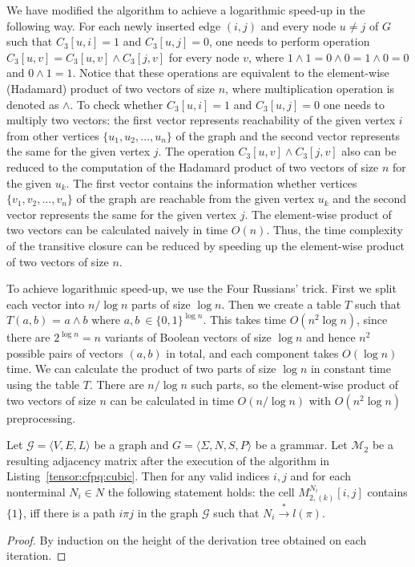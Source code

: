 We have modified the algorithm to achieve a logarithmic speed-up in the following way.
For each newly inserted edge $(i, j)$ and every node $u \neq j$ of $G$ such that $C_3[u, i] = 1$ and $C_3[u, j]=0$, one needs to perform operation $C_3[u,v] = C_3[u, v] \wedge C_3[j, v]$ for every node $v$, where $1 \wedge 1 = 0 \wedge 0 = 1 \wedge 0 = 0$ and $0 \wedge 1 = 1$.
Notice that these operations are equivalent to the element-wise (Hadamard) product of two vectors of size $n$, where multiplication operation is denoted as $\wedge$. To check whether $C_3[u, i] = 1$ and $C_3[u, j]=0$ one needs to multiply two vectors: the first vector represents reachability of the given vertex $i$ from other vertices $\{u_1, u_2, ..., u_n\}$ of the graph and the second vector represents the same for the given vertex $j$. The operation $C_3[u, v] \wedge C_3[j, v]$ also can be reduced to the computation of the Hadamard product of two vectors of size $n$ for the given $u_k$. The first vector contains the information whether vertices  $\{v_1, v_2, ..., v_n\}$ of the graph are reachable from the given vertex $u_k$ and the second vector represents the same for the given vertex $j$. The element-wise product of two vectors can be calculated naively in time $O(n)$. Thus, the time complexity of the transitive closure can be reduced by speeding up the element-wise product of two vectors of size $n$.


To achieve logarithmic speed-up, we use the Four Russians' trick.
First we split each vector into $n/\log n$ parts of size $\log n$.
Then we create a table $T$ such that $T(a, b)$ = $a \wedge b$ where $a, b \ \in {\{0,1\}}^{\log n}$.
This takes time $O(n^2 \log n)$, since there are $2^{\log n} = n$ variants of Boolean vectors of size $\log n$ and hence $n^2$ possible pairs of vectors $(a, b)$ in total, and each component takes $O(\log n)$ time.
We can calculate the product of two parts of size $\log n$ in constant time using the table $T$.
There are $n/\log n$ such parts, so the element-wise product of two vectors of size $n$ can be calculated in time $O(n/\log n)$ with $O(n^2 \log n)$ preprocessing.

\begin{theorem}
    Let $\mathcal{G} =  \langle V,E,L\rangle$ be a graph and $G = \langle\Sigma, N, S, P\rangle$ be a grammar.
    Let $\mathcal{M}_{2}$ be a resulting adjacency matrix after the execution of the algorithm in Listing~\ref{tensor:cfpq:cubic}. Then for any valid indices $i, j$ and for each nonterminal $N_i \in N$ the following statement holds: the cell $M_{2,(k)}^{N_i}[i,j]$ contains $\{1\}$, iff there is a path $i\pi j$ in the graph $\mathcal{G}$ such that $ N_i \xrightarrow{*} l(\pi)$.
\end{theorem}{}
\begin{proof}
    By induction on the height of the derivation tree obtained on each iteration.
\end{proof}{}

